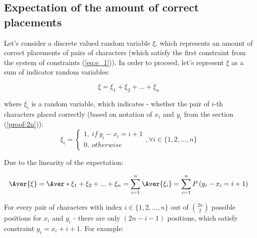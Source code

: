 \documentclass{article}
\begin{document}
\subsection{Expectation of the amount of correct placements} \label{expectation-derivation}

Let's consider a discrete valued random variable $\xi$, which represents an amount of correct placements of pairs of characters (which satisfy the first constraint from the system of constraints (\ref{eq:e_1})). In order to proceed, let's represent $\xi$ as a sum of indicator random variables:

\begin{equation} \label{eq:e_5}
\xi = \xi_1 + \xi_2 + ... + \xi_n
\end{equation}

where $\xi_i$ is a random variable, which indicates - whether the pair of $i$-th characters placed correctly (based on notation of $x_i$ and $y_i$ from the section (\ref{proof-2n})):
\begin{equation} 
\xi_i = 
\begin{cases}
1,\ if\ y_i - x_i = i + 1 \\
0,\ otherwise
\end{cases}, \forall i \in \{1, 2, ... , n\}
\end{equation}

Due to the linearity of the expectation:

\begin{equation} 
\Aver{\xi} = \Aver*{\xi_1 + \xi_2 + ... + \xi_n} = \sum_{i=1}^{n}\Aver{\xi_i} = \sum_{i=1}^{n}P\left(y_i - x_i = i + 1\right)
\end{equation} 

For every pair of characters with index $i \in \{1, 2, ... , n\}$ out of ${2n \choose 2}$ possible positions for $x_i$ and $y_i$ - there are only $(2n - i - 1)$ positions, which satisfy constraint $y_i = x_i + i + 1$. For example:
\end{document}
